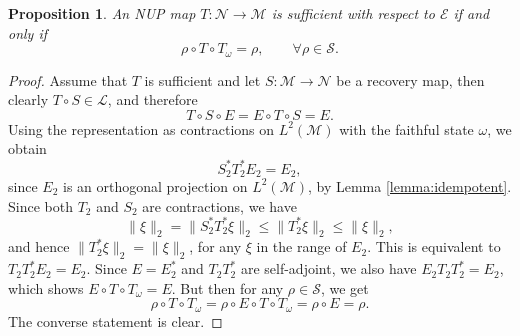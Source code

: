 \documentclass[10pt,a4paper]{amsart}
\newtheorem{prop}{Proposition}
\def\Ee{\mathcal E}
\def\Le{\mathcal L}
\def\Me{\mathcal M}
\def\Ne{\mathcal N}
\def\Se{\mathcal S}
\begin{document}
\begin{prop}\label{prop:universal} 
An NUP map  $T:\Ne\to \Me$ is  sufficient with respect
to $\Ee$ if and only if
\[
\rho\circ T\circ T_\omega=\rho,\qquad \forall \rho\in \Se.
\]

\end{prop}

\begin{proof} Assume that $T$ is sufficient and let $S:\Me\to \Ne$ be a recovery map, then
clearly $T\circ S\in \Le$, and therefore
\[
T\circ S\circ E=E\circ T\circ S=E.
\]
Using the representation as contractions on $L^2(\Me)$ with the faithful state $\omega$, we obtain
\[
S_2^*T_2^*E_2=E_2,
\]
since $E_2$ is an orthogonal projection on $L^2(\Me)$, by Lemma \ref{lemma:idempotent}. 
Since both $T_2$ and $S_2$ are contractions, we have 
\[
\|\xi\|_2=\|S_2^*T_2^*\xi\|_2\le \|T_2^*\xi\|_2\le \|\xi\|_2,
\]
and hence  $\|T_2^*\xi\|_2=\|\xi\|_2$, for any $\xi$ in the range of $E_2$. This is
equivalent to $T_2T_2^*E_2=E_2$. 
Since $E=E_2^*$ and $T_2T_2^*$ are self-adjoint, we also have $E_2T_2T_2^*=E_2$, which shows $E\circ T\circ T_\omega=E$. 
But then for
any $\rho\in \Se$, we get
\[
\rho\circ T\circ T_\omega=\rho\circ E\circ T\circ T_\omega=\rho\circ E=\rho.
\]
The converse statement is clear.

\end{proof}
\end{document}
